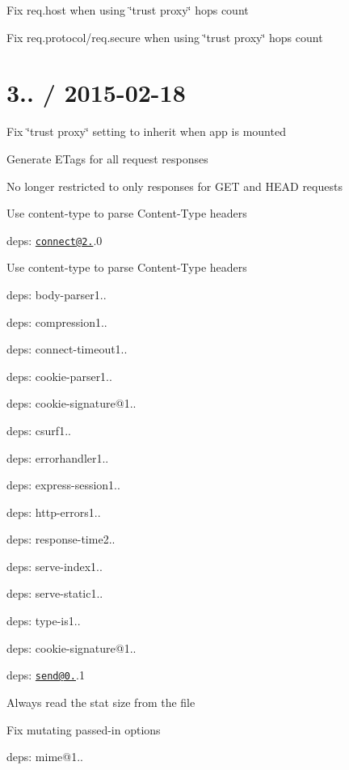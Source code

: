 \begin{DoxyItemize}
\item Fix {\ttfamily req.\+host} when using \char`\"{}trust proxy\char`\"{} hops count
\item Fix {\ttfamily req.\+protocol}/{\ttfamily req.\+secure} when using \char`\"{}trust proxy\char`\"{} hops count
\end{DoxyItemize}

\section*{3.. / 2015-\/02-\/18 }


\begin{DoxyItemize}
\item Fix {\ttfamily \char`\"{}trust proxy\char`\"{}} setting to inherit when app is mounted
\item Generate {\ttfamily E\+Tag}s for all request responses
\begin{DoxyItemize}
\item No longer restricted to only responses for {\ttfamily G\+E\+T} and {\ttfamily H\+E\+A\+D} requests
\end{DoxyItemize}
\item Use {\ttfamily content-\/type} to parse {\ttfamily Content-\/\+Type} headers
\item deps\+: \href{mailto:connect@2.29}{\tt connect@2.}.0
\begin{DoxyItemize}
\item Use {\ttfamily content-\/type} to parse {\ttfamily Content-\/\+Type} headers
\item deps\+: body-\/parser1..
\item deps\+: compression1..
\item deps\+: connect-\/timeout1..
\item deps\+: cookie-\/parser1..
\item deps\+: cookie-\/signature@1..
\item deps\+: csurf1..
\item deps\+: errorhandler1..
\item deps\+: express-\/session1..
\item deps\+: http-\/errors1..
\item deps\+: response-\/time2..
\item deps\+: serve-\/index1..
\item deps\+: serve-\/static1..
\item deps\+: type-\/is1..
\end{DoxyItemize}
\item deps\+: cookie-\/signature@1..
\item deps\+: \href{mailto:send@0.12}{\tt send@0.}.1
\begin{DoxyItemize}
\item Always read the stat size from the file
\item Fix mutating passed-\/in {\ttfamily options}
\item deps\+: mime@1..
\end{DoxyItemize}
\end{DoxyItemize}


